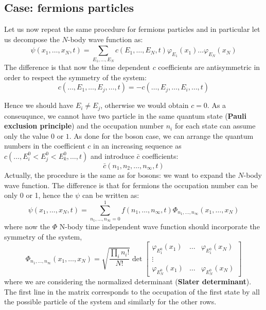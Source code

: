 \documentclass[../main/main.tex]{subfiles}
\begin{document}
\subsection{Case: fermions particles}

Let us now repeat the same procedure for fermions particles and in particular let us decompose the \( N \)-body wave function as:
\begin{equation*}
  \psi (x_1,\dots,x_N,t) = \sum_{E_1,\dots,E_N}^{} c(E_1,\dots,E_N,t) \varphi _{E_1} (x_1) \dots \varphi _{E_N} (x_N)
\end{equation*}
The difference is that now the time dependent \( c \) coefficients are antisymmetric in order to respect the symmetry of the system:
\begin{equation*}
  c(\dots,E_1,\dots,E_j,\dots,t) = - c(\dots,E_j,\dots,E_i,\dots,t)
\end{equation*}

Hence we should have \( E_i \neq E_j \), otherwise we would obtain \( c=0 \). As a conseuqunce, we cannot have two particle in the same quantum state (\textbf{Pauli exclusion principle}) and the occupation number \( n_i \) for each state can assume only the value \( 0 \) or \( 1 \).
As done for the boson case, we can arrange the quantum numbers in the coefficient \( c \) in an increasing sequence as \( c(\dots,E_i^0< E_j^0<E_k^0, \dots,t) \) and introduce \( \bar{c}  \) coefficients:
\begin{equation*}
  \bar{c} (n_1,n_2, \dots, n_ \infty ,t)
\end{equation*}
Actually, the procedure is the same as for bosons: we want to expand the  \( N \)-body wave function. The difference is that for fermions the occupation number can be only 0 or 1, hence the \( \psi  \) can be written as:
\begin{equation*}
  \psi (x_1, \dots,x_N,t) = \sum_{n_1, \dots, n_ \infty = 0}^{1}
  f(n_1, \dots, n_ \infty ,t) \Phi _{n_1,\dots,n_ \infty } (x_1,\dots,x_N)
\end{equation*}
where now the \( \Phi  \) N-body time independent wave function should incorporate the symmetry of the system,
\begin{equation}
  \Phi _{n_1,\dots,n_ \infty } (x_1, \dots, x_N) = \sqrt{\frac{\prod_{i}^{} n_i!  }{N!}} \det\begin{bmatrix}
    \varphi _{E_1^0}(x_1)& \dots &\varphi _{E_1^0}(x_N) \\
    \vdots & & \\
    \varphi _{E_N^0}(x_1) & \dots & \varphi _{E_N^0}(x_N)
  \end{bmatrix}
\end{equation}
where we are considering the normalized determinant (\textbf{Slater determinant}). The first line in the matrix corresponds to the occupation of the first state by all the possible particle of the system and similarly for the other rows.
\end{document}
